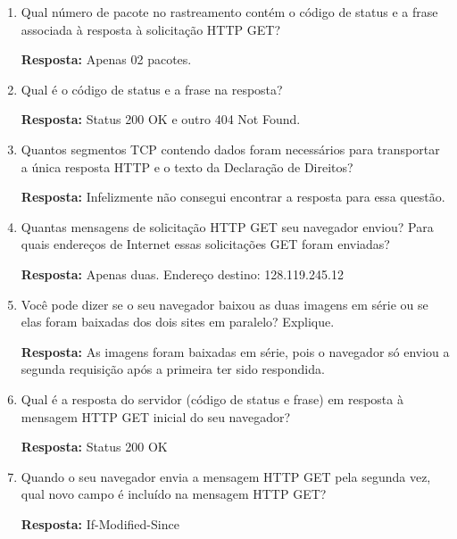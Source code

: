 \documentclass[12pt,a4paper]{report}
\begin{document}
\begin{enumerate}
		\item Qual número de pacote no rastreamento contém o código de status e a frase associada à resposta à solicitação HTTP GET?

		\textbf{Resposta:} Apenas 02 pacotes.

		\item Qual é o código de status e a frase na resposta?
		
		\textbf{Resposta:} Status 200 OK e outro 404 Not Found.	

		\item Quantos segmentos TCP contendo dados foram necessários para transportar a única resposta HTTP e o texto da Declaração de Direitos?

		\textbf{Resposta:} Infelizmente não consegui encontrar a resposta para essa questão.

		\item Quantas mensagens de solicitação HTTP GET seu navegador enviou? Para quais endereços de Internet essas solicitações GET foram enviadas?

		\textbf{Resposta:} Apenas duas. Endereço destino: 128.119.245.12

		\item Você pode dizer se o seu navegador baixou as duas imagens em série ou se elas foram baixadas dos dois sites em paralelo? Explique.

		\textbf{Resposta:} As imagens foram baixadas em série, pois o navegador só enviou a segunda requisição após a primeira ter sido respondida.

		\item Qual é a resposta do servidor (código de status e frase) em resposta à mensagem HTTP GET inicial do seu navegador?

		\textbf{Resposta:} Status 200 OK

		\item Quando o seu navegador envia a mensagem HTTP GET pela segunda vez, qual novo campo é incluído na mensagem HTTP GET?

		\textbf{Resposta:} If-Modified-Since
		
	\end{enumerate} 
\end{document}

